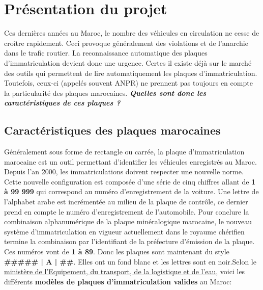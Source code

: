 \section{Présentation du projet}
Ces dernières années au Maroc, le nombre des véhicules en circulation ne cesse de croître rapidement. Ceci provoque généralement des violations et de l'anarchie dans le trafic routier. La reconnaissance automatique des plaques d’immatriculation devient donc une urgence. Certes il existe déjà sur le marché des outils qui permettent de lire automatiquement les plaques d’immatriculation. Toutefois, ceux-ci (appelés souvent ANPR) ne prennent pas toujours en compte la particularité des plaques marocaines. \textbf{\textit{Quelles sont donc les caractéristiques de ces plaques ?}}

    \subsection{Caractéristiques des plaques marocaines}
    Généralement sous forme de rectangle ou carrée, la plaque d’immatriculation marocaine est un outil permettant d’identifier les véhicules enregistrés au Maroc. Depuis l’an 2000, les immatriculations doivent respecter une nouvelle norme. Cette nouvelle configuration est composée d’une série de cinq chiffres allant de \textbf{1 à 99 999} qui correspond au numéro d’enregistrement de la voiture. Une lettre de l’alphabet arabe est incrémentée au milieu de la plaque de contrôle, ce dernier prend en compte le numéro d’enregistrement de l’automobile. Pour conclure la combinaison alphanumérique de la plaque minéralogique marocaine, le nouveau système d’immatriculation en vigueur actuellement dans le royaume chérifien termine la combinaison par l’identifiant de la préfecture d’émission de la plaque. Ces numéros vont de \textbf{1 à 89}. Donc les plaques sont maintenant du style \textbf{\#\#\#\#\# | A | \#\#}. Elles ont un fond blanc et les lettres sont en noir.Selon le \href{http://www.equipement.gov.ma/Transport-routier/Carte-grise/Pages/Differents-modeles-de-plaques-d-immatriculation-.aspx}{ministère de l'Equipement, du transport, de la logistique et de l'eau}, voici les différents \textbf{modèles de plaques d'immatriculation valides} au Maroc:
